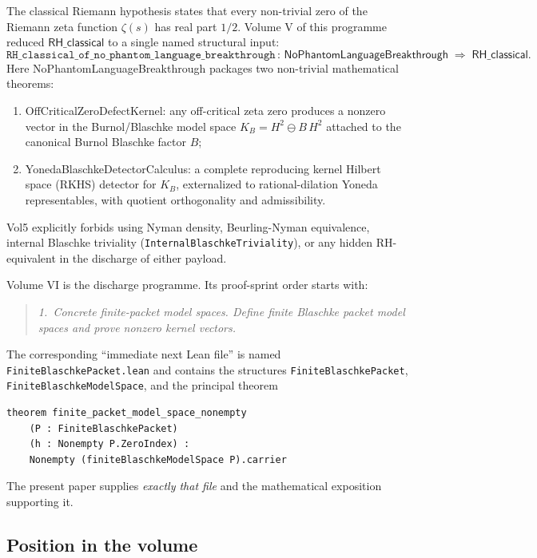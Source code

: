 \documentclass[11pt]{article}
\theoremstyle{plain}
\theoremstyle{definition}
\theoremstyle{remark}
\newcommand{\HtH}{H^{2}}
\newcommand{\KB}{K_{B}}
\newcommand{\code}[1]{\texttt{#1}}
\begin{document}
The classical Riemann hypothesis states that every non-trivial zero of the
Riemann zeta function $\zeta(s)$ has real part $1/2$.  Volume V of this
programme reduced \(\textsf{RH\_classical}\) to a single named structural
input:
\begin{equation}\label{eq:vol5conditional}
  \texttt{RH\_classical\_of\_no\_phantom\_language\_breakthrough}\,:\,
   \textsf{NoPhantomLanguageBreakthrough} \;\Longrightarrow\; \textsf{RH\_classical}.
\end{equation}
Here \textsf{NoPhantomLanguageBreakthrough} packages two non-trivial
mathematical theorems:
\begin{enumerate}[label=(\alph*)]
  \item \textsf{OffCriticalZeroDefectKernel}: any off-critical zeta zero
        produces a nonzero vector in the Burnol/Blaschke model space
        $\KB = \HtH \ominus B\,\HtH$ attached to the canonical Burnol
        Blaschke factor $B$;
  \item \textsf{YonedaBlaschkeDetectorCalculus}: a complete reproducing
        kernel Hilbert space (RKHS) detector for $\KB$, externalized to
        rational-dilation Yoneda representables, with quotient orthogonality
        and admissibility.
\end{enumerate}
Vol5 explicitly forbids using Nyman density, Beurling-Nyman equivalence,
internal Blaschke triviality (\code{InternalBlaschkeTriviality}), or any
hidden RH-equivalent in the discharge of either payload.

Volume VI is the discharge programme.  Its proof-sprint order
\cite{vol5NextSteps} starts with:
\begin{quote}
\emph{1.~Concrete finite-packet model spaces.  Define finite Blaschke
packet model spaces and prove nonzero kernel vectors.}
\end{quote}
The corresponding ``immediate next Lean file'' is named
\code{FiniteBlaschkePacket.lean} and contains the structures
\code{FiniteBlaschkePacket}, \code{FiniteBlaschkeModelSpace}, and the
principal theorem
\begin{verbatim}
theorem finite_packet_model_space_nonempty
    (P : FiniteBlaschkePacket)
    (h : Nonempty P.ZeroIndex) :
    Nonempty (finiteBlaschkeModelSpace P).carrier
\end{verbatim}
The present paper supplies \emph{exactly that file} and the mathematical
exposition supporting it.

\subsection{Position in the volume}
\end{document}
